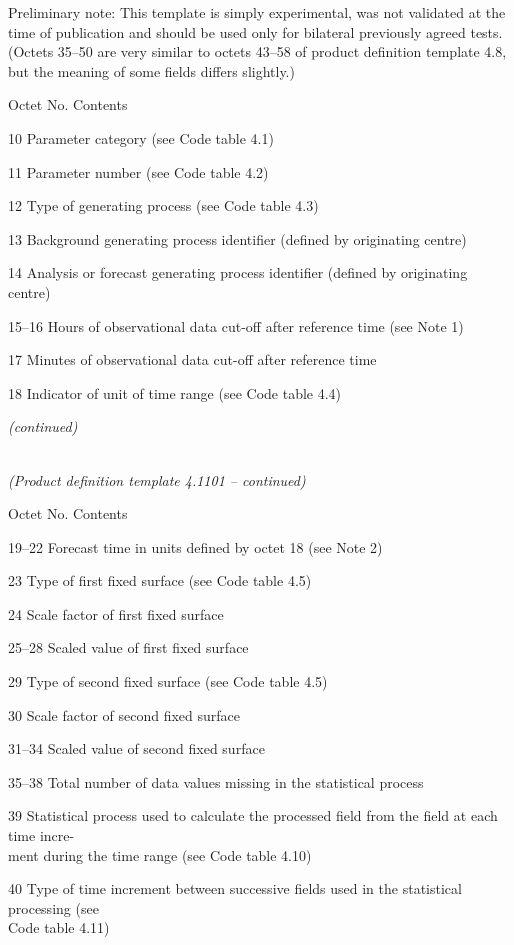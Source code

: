 Preliminary note: This template is simply experimental, was not validated at the time of publication and should be used only for bilateral previously agreed tests. (Octets 35--50 are very similar to octets 43--58 of product definition template 4.8, but the meaning of some fields differs slightly.)

Octet No. Contents

10 Parameter category (see Code table 4.1)

11 Parameter number (see Code table 4.2)

12 Type of generating process (see Code table 4.3)

13 Background generating process identifier (defined by originating centre)

14 Analysis or forecast generating process identifier (defined by originating centre)

15--16 Hours of observational data cut-off after reference time (see Note 1)

17 Minutes of observational data cut-off after reference time

18 Indicator of unit of time range (see Code table 4.4)

\emph{(continued)}

\emph{\\
(Product definition template 4.1101 -- continued)}

Octet No. Contents

19--22 Forecast time in units defined by octet 18 (see Note 2)

23 Type of first fixed surface (see Code table 4.5)

24 Scale factor of first fixed surface

25--28 Scaled value of first fixed surface

29 Type of second fixed surface (see Code table 4.5)

30 Scale factor of second fixed surface

31--34 Scaled value of second fixed surface

35--38 Total number of data values missing in the statistical process

39 Statistical process used to calculate the processed field from the field at each time incre-\\
ment during the time range (see Code table 4.10)

40 Type of time increment between successive fields used in the statistical processing (see\\
Code table 4.11)


